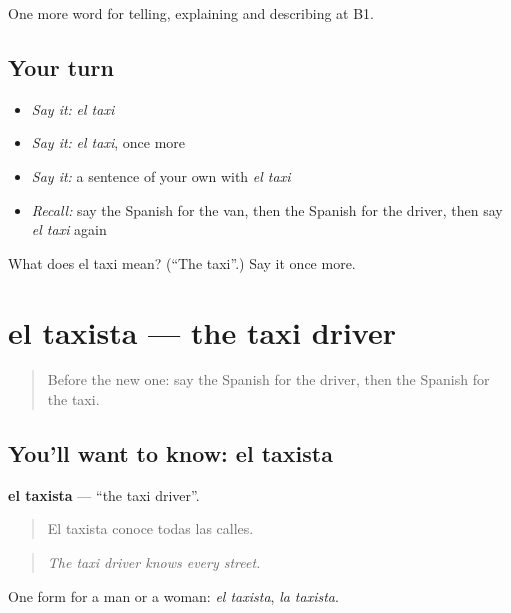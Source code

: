 \begin{grammarlens}[title={What you've built}]
One more word for telling, explaining and describing at B1.
\end{grammarlens}

\subsection*{Your turn}
\begin{itemize}
\raggedright
  \item \emph{Say it:} \emph{el taxi}
  \item \emph{Say it:} \emph{el taxi}, once more
  \item \emph{Say it:} a sentence of your own with \emph{el taxi}
  \item \emph{Recall:} say the Spanish for the van, then the Spanish for the driver, then say \emph{el taxi} again
\end{itemize}

\begin{tcolorbox}[breakable,colback=teal!4,colframe=teal!35!black,title={Before you move on}]
What does el taxi mean? (\textquotedblleft{}The taxi\textquotedblright{}.) Say it once more.
\end{tcolorbox}
\section[el taxista]{el taxista — the taxi driver}

\label{lesson:ES-C641-taxista}



\begin{quote}
Before the new one: say the Spanish for the driver, then the Spanish for the taxi.
\end{quote}

\subsection*{You'll want to know: el taxista}
\textbf{el taxista} — \textquotedblleft{}the taxi driver\textquotedblright{}.

\begin{quote}
El taxista conoce todas las calles.
\end{quote}

\begin{quote}
\emph{The taxi driver knows every street.}
\end{quote}

One form for a man or a woman: \emph{el taxista}, \emph{la taxista}.

